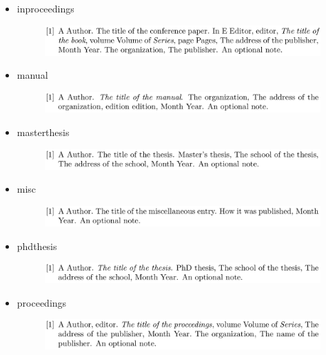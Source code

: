 \documentclass{fieldpractice-geo}
\begin{document}
\begin{itemize}
	\item inproceedings
	\begin{figure}[H]
		\centering
		\includegraphics[width=1\textwidth]{example-figures/inproceedings.png}
		\caption*{}
	\end{figure}
	\item manual
	\begin{figure}[H]
		\centering
		\includegraphics[width=1\textwidth]{example-figures/manual.png}
		\caption*{}
	\end{figure}
	\item masterthesis
	\begin{figure}[H]
		\centering
		\includegraphics[width=1\textwidth]{example-figures/masterthesis.png}
		\caption*{}
	\end{figure}
	\item misc
	\begin{figure}[H]
		\centering
		\includegraphics[width=1\textwidth]{example-figures/misc.png}
		\caption*{}
	\end{figure}
	\item phdthesis
	\begin{figure}[H]
		\centering
		\includegraphics[width=1\textwidth]{example-figures/phdthesis.png}
		\caption*{}
	\end{figure}
	\item proceedings
	\begin{figure}[H]
		\centering
		\includegraphics[width=1\textwidth]{example-figures/proceedings.png}

\end{figure}
\end{itemize}
\end{document}
